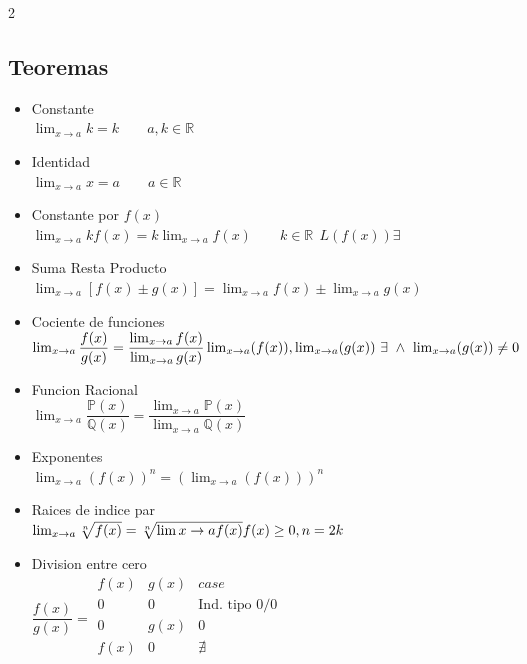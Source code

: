 \documentclass{article}
\begin{document}
\begin{multicols}{2}
\subsection{Teoremas}
\begin{itemize}
    \item Constante\\
    $\lim_{x \to a} k = k \quad \quad a,k \in \mathbb{R}$
    \item Identidad\\
    $\lim_{x \to a} x = a \quad \quad a \in \mathbb{R}$
    \item Constante por $f(x)$\\
    $\lim_{x \to a} kf(x) = k\lim_{x \to a} f(x) \quad \quad k \in \mathbb{R}\ \ L(f(x)) \exists$
    \item Suma Resta Producto\\
    $\lim_{x \to a} [f(x)\pm g(x)] = \lim_{x \to a} f(x) \pm \lim_{x \to a} g(x) $
    \item Cociente de funciones\\
    $\lim_{x \to a} \dfrac{f(x)}{g(x)} = \dfrac{\lim_{x \to a} f(x)}{\lim_{x \to a} g(x)} \\\lim_{x\to a}(f(x)), \lim_{x\to a}(g(x)) \ \exists \  \wedge\ \lim_{x\to a}(g(x)) \ne 0 $
    \item Funcion Racional\\
    $\lim_{x \to a} \dfrac{\mathbb{P}(x)}{\mathbb{Q}(x)}=\dfrac{\lim_{x\to a} \mathbb{P}(x)}{\lim_{x\to a} \mathbb{Q}(x)}$
    \item Exponentes\\
    $\lim_{x\to a}(f(x))^n=(\lim_{x\to a}(f(x)))^n$
    \item Raices de indice par\\
    $\lim_{x\to a} \sqrt[n]{f(x)}=\sqrt[n]{\lim{x\to a} f(x)} \\ f(x) \ge 0, n=2k$
    \item Division entre cero \\
    $\dfrac{f(x)}{g(x)}=
    \begin{matrix}
        f(x) & g(x) & case \\
        0 & 0 &\text{Ind. tipo } 0/0 \\
        0 & g(x)  & 0\\
        f(x) & 0 & \nexists\\
    \end{matrix}$
\end{itemize}



\end{multicols}
\end{document}
